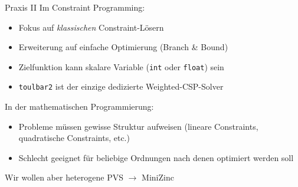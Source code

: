\documentclass[handout,10pt,xcolor={dvipsnames},fleqn]{beamer}
\begin{document}
\begin{frame}{Praxis II}
Im Constraint Programming:
\begin{itemize}
\item Fokus auf \emph{klassischen} Constraint-Lösern
\item Erweiterung auf einfache Optimierung (Branch \& Bound)
\item Zielfunktion kann skalare Variable (\texttt{int} oder \texttt{float}) sein
\item { \color{isseorange} \texttt{toulbar2} ist der einzige dedizierte Weighted-CSP-Solver}
\end{itemize}

\vspace*{2ex}

In der mathematischen Programmierung:

\begin{itemize}
\item Probleme müssen gewisse Struktur aufweisen (lineare Constraints, quadratische Constraints, etc.)
\item Schlecht geeignet für beliebige Ordnungen nach denen optimiert werden soll
\end{itemize}

\vspace*{1ex} \pause 
Wir wollen aber heterogene PVS $\rightarrow$ \alert{MiniZinc}
\end{frame}
\end{document}

